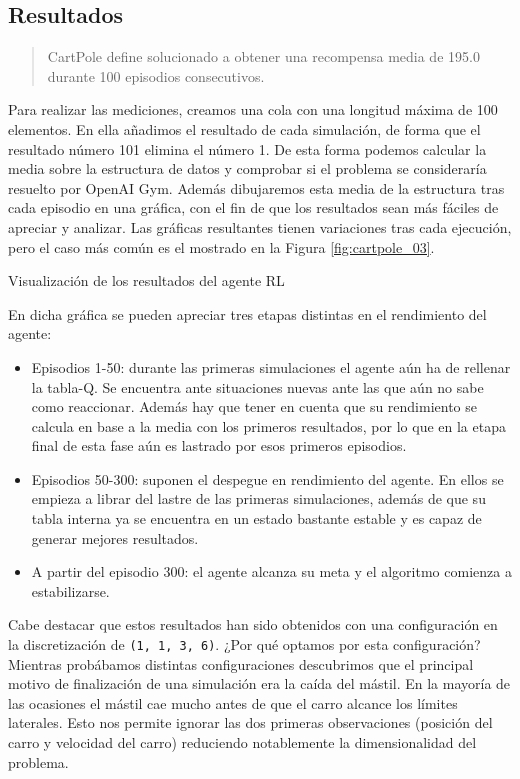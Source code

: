 \subsection{Resultados}
\begin{quote}
    CartPole define solucionado a obtener una recompensa media de 195.0 durante 100 episodios consecutivos.
\end{quote}

Para realizar las mediciones, creamos una cola con una longitud máxima de 100 elementos. En ella añadimos el resultado de cada simulación, de forma que el resultado número 101 elimina el número 1. De esta forma podemos calcular la media sobre la estructura de datos y comprobar si el problema se consideraría resuelto por OpenAI Gym. Además dibujaremos esta media de la estructura tras cada episodio en una gráfica, con el fin de que los resultados sean más fáciles de apreciar y analizar. Las gráficas resultantes tienen variaciones tras cada ejecución, pero el caso más común es el mostrado en la Figura \ref{fig:cartpole_03}.

%
       {Visualización de los resultados del agente RL}

En dicha gráfica se pueden apreciar tres etapas distintas en el rendimiento del agente:
\begin{itemize}
    \item Episodios 1-50: durante las primeras simulaciones el agente aún ha de rellenar la tabla-Q. Se encuentra ante situaciones nuevas ante las que aún no sabe como reaccionar. Además hay que tener en cuenta que su rendimiento se calcula en base a la media con los primeros resultados, por lo que en la etapa final de esta fase aún es lastrado por esos primeros episodios.
    \item Episodios 50-300: suponen el despegue en rendimiento del agente. En ellos se empieza a librar del lastre de las primeras simulaciones, además de que su tabla interna ya se encuentra en un estado bastante estable y es capaz de generar mejores resultados.
    \item A partir del episodio 300: el agente alcanza su meta y el algoritmo comienza a estabilizarse.
\end{itemize}

Cabe destacar que estos resultados han sido obtenidos con una configuración en la discretización de \texttt{(1, 1, 3, 6)}. ¿Por qué optamos por esta configuración? Mientras probábamos distintas configuraciones descubrimos que el principal motivo de finalización de una simulación era la caída del mástil. En la mayoría de las ocasiones el mástil cae mucho antes de que el carro alcance los límites laterales. Esto nos permite ignorar las dos primeras observaciones (posición del carro y velocidad del carro) reduciendo notablemente la dimensionalidad del problema.


